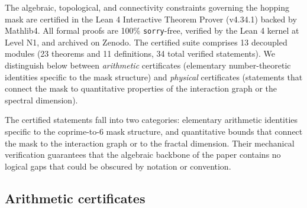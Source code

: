 \documentclass[11pt,a4paper]{article}
\begin{document}
The algebraic, topological, and connectivity constraints governing the hopping mask are certified in the \textsf{Lean 4} Interactive Theorem Prover (v4.34.1) backed by \textsf{Mathlib4}. All formal proofs are 100\% \texttt{sorry}-free, verified by the \textsf{Lean 4} kernel at Level N1, and archived on Zenodo. The certified suite comprises 13 decoupled modules (23 theorems and 11 definitions, 34 total verified statements). We distinguish below between \emph{arithmetic} certificates (elementary number-theoretic identities specific to the mask structure) and \emph{physical} certificates (statements that connect the mask to quantitative properties of the interaction graph or the spectral dimension).

The certified statements fall into two categories: elementary arithmetic
identities specific to the coprime-to-6 mask structure, and quantitative
bounds that connect the mask to the interaction graph or to the fractal
dimension. Their mechanical verification guarantees that the algebraic
backbone of the paper contains no logical gaps that could be obscured by
notation or convention.

\subsection*{Arithmetic certificates}
\end{document}
